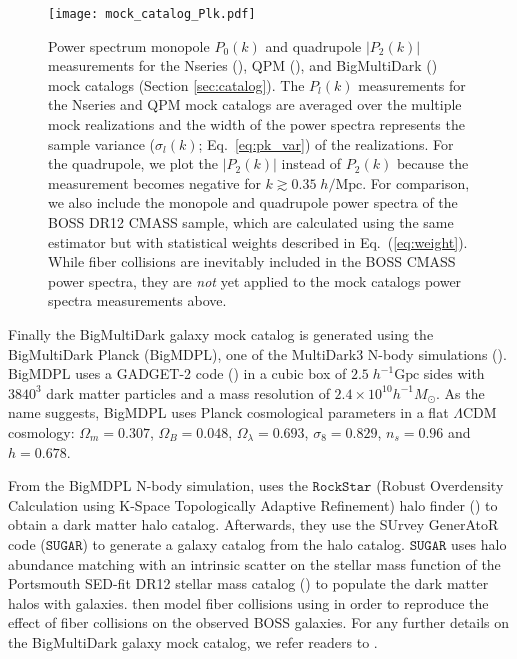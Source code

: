 \begin{figure*}
\begin{center}
\texttt{[image: mock\_catalog\_Plk.pdf]} 
\caption{
Power spectrum monopole $P_0(k)$ and 
quadrupole $|P_2(k)|$ measurements for the Nseries (\nseriescolor), 
QPM (\qpmcolor), and BigMultiDark (\bmdcolor) mock catalogs 
(Section \ref{sec:catalog}). The $P_l(k)$ measurements 
for the Nseries and QPM mock catalogs are averaged over the
multiple mock realizations and the width of the power spectra represents 
the sample variance ($\sigma_l(k)$; Eq.~\ref{eq:pk_var}) of the realizations. 
For the quadrupole, we plot the $|{P_2(k)}|$ instead of 
${P_2(k)}$ because the measurement becomes negative for 
$k \gtrsim 0.35\;h/\mathrm{Mpc}$. For comparison, we also include the monopole and 
quadrupole power spectra of the BOSS DR12 CMASS sample, which are calculated 
using the same estimator but with statistical weights described in Eq.~(\ref{eq:weight}). 
While fiber collisions are inevitably included in the BOSS CMASS power spectra, 
they are {\it not} yet applied to the mock catalogs power spectra measurements above. } 
\label{fig:mockpk}
\end{center}
\end{figure*}

Finally the BigMultiDark galaxy mock catalog is generated using the 
BigMultiDark Planck (BigMDPL), one of the MultiDark3 N-body simulations 
(\citealt{Klypin:2014aa}). BigMDPL uses a GADGET-2 code (\citealt{Springel:2005aa})
in a cubic box of $2.5\;h^{-1}\mathrm{Gpc}$ sides with $3840^3$ dark matter 
particles and a mass resolution of $2.4\times 10^{10} h^{-1}M_\odot$. 
As the name suggests, BigMDPL uses Planck cosmological parameters in a flat $\Lambda$CDM cosmology: 
$\Omega_m = 0.307$, $\Omega_B = 0.048$, $\Omega_\lambda = 0.693$, $\sigma_8 = 0.829$, 
$n_s = 0.96$ and $h = 0.678$. 

From the BigMDPL N-body simulation, \cite{Rodriguez-Torres:2015aa} uses 
the $\mathtt{RockStar}$ (Robust Overdensity Calculation using K-Space Topologically 
Adaptive Refinement) halo finder (\citealt{Behroozi:2013aa}) to obtain 
a dark matter halo catalog. Afterwards, they use the 
SUrvey GenerAtoR code ($\mathtt{SUGAR}$) to generate a galaxy catalog from the halo 
catalog. $\mathtt{SUGAR}$ uses halo abundance matching with an intrinsic scatter 
on the stellar mass function of the Portsmouth SED-fit DR12 stellar mass
catalog (\citealt{Maraston:2013aa}) to populate the dark matter halos with  
galaxies. \cite{Rodriguez-Torres:2015aa} then model fiber collisions using 
\cite{Guo:2012aa} in order to reproduce the effect of fiber collisions on 
the observed BOSS galaxies. For any further details on the BigMultiDark 
galaxy mock catalog, we refer readers to \cite{Rodriguez-Torres:2015aa}.

